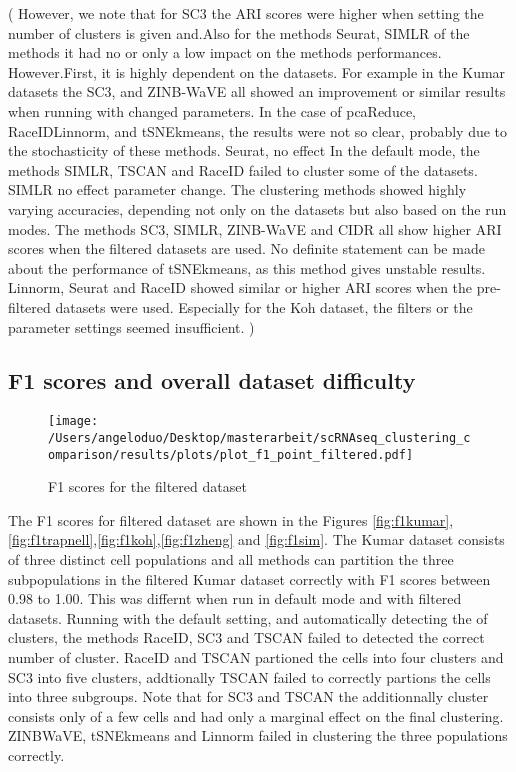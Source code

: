 \documentclass[11pt, a4paper]{article}\usepackage[]{graphicx}\usepackage[]{color}
\begin{document}
( However, we note that for SC3 the ARI scores were higher when setting the number of clusters is given and.Also for the methods Seurat, SIMLR  of the methods it had no or only a low impact on the methods performances. However.First, it is highly dependent on the datasets. For example in the Kumar datasets the 
SC3,  and ZINB-WaVE all showed an improvement or similar results when running with changed parameters. In the case of pcaReduce, RaceIDLinnorm, and tSNEkmeans, the results were not so clear, probably due to the stochasticity of these methods. Seurat, no effect In the default mode, the methods SIMLR, TSCAN and RaceID failed to cluster some of the datasets. SIMLR no effect parameter change. The clustering methods showed highly varying accuracies, depending not only on the datasets but also based on the run modes. The methods SC3, SIMLR, ZINB-WaVE and CIDR all show higher ARI scores when the filtered datasets are used. No definite statement can be made about the performance of tSNEkmeans, as this method gives unstable results. Linnorm, Seurat and RaceID showed similar or higher ARI scores when the pre-filtered datasets were used. Especially for the Koh dataset, the filters or the parameter settings seemed insufficient.   )

\subsection{F1 scores and overall dataset difficulty}

\begin{figure}[!h]
\texttt{[image: /Users/angeloduo/Desktop/masterarbeit/scRNAseq\_clustering\_comparison/results/plots/plot\_f1\_point\_filtered.pdf]}
\caption{F1 scores for the filtered  dataset }
\label{fig:f1pointplot}
\end{figure}

The F1 scores for filtered dataset are shown in the Figures \ref{fig:f1kumar},\ref{fig:f1trapnell},\ref{fig:f1koh},\ref{fig:f1zheng} and \ref{fig:f1sim}. The Kumar dataset consists of three distinct cell populations and all methods can partition the three subpopulations in the filtered Kumar dataset correctly with F1 scores between 0.98 to 1.00. This was differnt when run in default mode and with filtered datasets. Running with the default setting, and automatically detecting the of clusters, the methods RaceID, SC3 and TSCAN failed to detected the correct number of cluster. RaceID and TSCAN partioned the cells into four clusters and SC3 into five clusters, addtionally TSCAN failed to correctly partions the cells into three subgroups. Note that for SC3 and TSCAN the additionnally cluster consists only of a few cells and had only a marginal effect on the final clustering.
ZINBWaVE, tSNEkmeans and Linnorm failed in clustering the three populations correctly.
\end{document}
